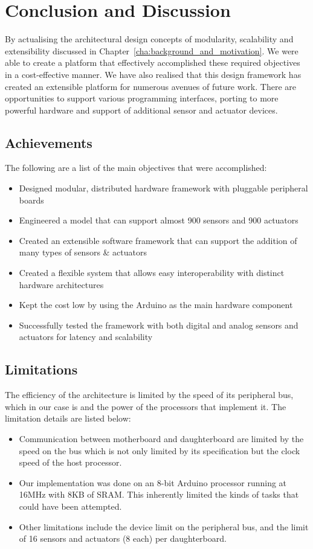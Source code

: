 \chapter{Conclusion and Discussion} 
By actualising the architectural design concepts of modularity, scalability and extensibility discussed in Chapter~\ref{cha:background_and_motivation}. We were able to create a platform that effectively accomplished these required objectives in a cost-effective manner. We have also realised that this design framework has created an extensible platform for numerous avenues of future work. There are opportunities to support various programming interfaces, porting \xten to more powerful hardware and support of additional sensor and actuator devices.

\section{Achievements}
The following are a list of the main objectives that were accomplished:
\begin{itemize}
\item Designed modular, distributed hardware framework with pluggable peripheral boards
\item Engineered a model that can support almost 900 sensors and 900 actuators
\item Created an extensible software framework that can support the addition of many types of sensors \& actuators
\item Created a flexible system that allows easy interoperability with distinct hardware architectures
\item Kept the cost low by using the Arduino as the main hardware component
\item Successfully tested the framework with both digital and analog sensors and actuators for latency and scalability
\end{itemize}

\section{Limitations}
The efficiency of the \xten architecture is limited by the speed of its peripheral bus, which in our case is \iic and the power of the processors that implement it.
The limitation details are listed below:
\begin{itemize}
\item Communication between motherboard and daughterboard are limited by the speed on the \iic bus which is not only limited by its specification but the clock speed of the host processor.
\item Our implementation was done on an 8-bit Arduino processor running at 16MHz with 8KB of SRAM. This inherently limited the kinds of tasks that could have been attempted.
\item Other limitations include the  device limit on the peripheral bus, and the limit of 16 sensors and actuators (8 each) per daughterboard.
\end{itemize}

